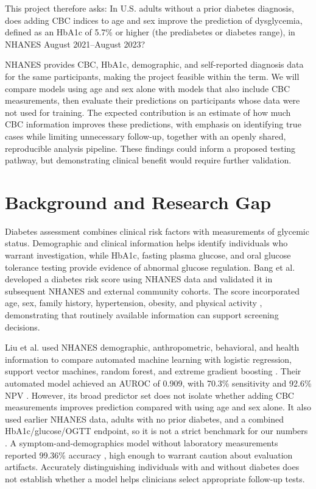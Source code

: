 \documentclass[conference]{IEEEtran}
\begin{document}
This project therefore asks: In U.S. adults without a prior diabetes diagnosis, does adding CBC indices to age and sex improve the prediction of dysglycemia, defined as an HbA1c of 5.7\% or higher (the prediabetes or diabetes range), in NHANES August 2021--August 2023?


NHANES provides CBC, HbA1c, demographic, and self-reported diagnosis data for the same participants, making the project feasible within the term. We will compare models using age and sex alone with models that also include CBC measurements, then evaluate their predictions on participants whose data were not used for training. The expected contribution is an estimate of how much CBC information improves these predictions, with emphasis on identifying true cases while limiting unnecessary follow-up, together with an openly shared, reproducible analysis pipeline. These findings could inform a proposed testing pathway, but demonstrating clinical benefit would require further validation.


\section{Background and Research Gap}

Diabetes assessment combines clinical risk factors with measurements of glycemic status. Demographic and clinical information helps identify individuals who warrant investigation, while HbA1c, fasting plasma glucose, and oral glucose tolerance testing provide evidence of abnormal glucose regulation. Bang et al.\cite{bang2009} developed a diabetes risk score using NHANES data and validated it in subsequent NHANES and external community cohorts. The score incorporated age, sex, family history, hypertension, obesity, and physical activity , demonstrating that routinely available information can support screening decisions.


Liu et al. \cite{liu2025} used NHANES demographic, anthropometric, behavioral, and health information to compare automated machine learning with logistic regression, support vector machines, random forest, and extreme gradient boosting . Their automated model achieved an AUROC of 0.909, with 70.3\% sensitivity and 92.6\% NPV \cite{liu2025}. However, its broad predictor set does not isolate whether adding CBC measurements improves prediction compared with using age and sex alone. It also used earlier NHANES data, adults with no prior diabetes, and a combined HbA1c/glucose/OGTT endpoint, so it is not a strict benchmark for our numbers \cite{liu2025}. A symptom-and-demographics model without laboratory measurements reported 99.36\% accuracy \cite{rahman2023}, high enough to warrant caution about evaluation artifacts. Accurately distinguishing individuals with and without diabetes does not establish whether a model helps clinicians select appropriate follow-up tests.
\end{document}
